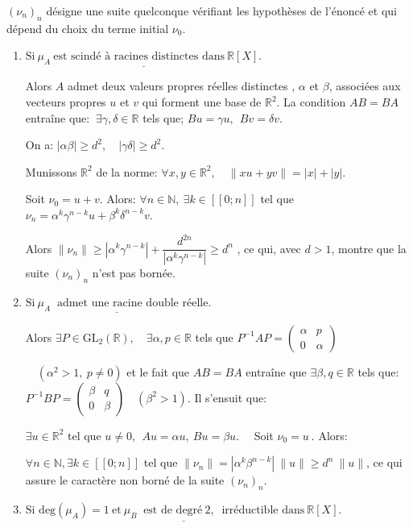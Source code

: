 $( \nu_ n) _n$ désigne une suite quelconque vérifiant les hypothèses de l'énoncé  et qui dépend du choix du terme initial $\nu_ 0.$
\begin{enumerate} 
\item $\underline{\mbox {Si}\:  \mu_A \: \mbox   {est scindé à racines distinctes dans}\: \mathbb R[X].}$

Alors $A$ admet deux valeurs propres réelles distinctes , $\alpha$ et $\beta$, associées aux vecteurs propres $u$ et $v$ qui forment une base de $\mathbb R ^2$. La condition $AB=BA$ entraîne que: $\:\exists \gamma, \delta \in \mathbb R$ tels que; $Bu =\gamma u,\:\: Bv = \delta v$. 

On a: $|\alpha \beta | \geqslant d^2, \quad |\gamma\delta |\geqslant d^2.$ 


Munissons $\mathbb R^2$ de la norme: $ \forall x,y\in \mathbb R^2,\quad \|xu+yv\| = |x| + |y|.$
  
  
  Soit $\nu_0 = u+v$. Alors: $\forall n \in \mathbb N,\:\exists k \in [\![0;n]\!]$ tel que $\nu_n = \alpha ^k \gamma^{n-k} u + \beta^{k}\delta^{n-k}v$.
  
  Alors $\|\nu_ n \|\geqslant | \alpha^k \gamma ^{n-k}|+ \dfrac {d^{2n}}{|\alpha ^k \gamma^{n-k}|}\geqslant d^{n}$ , ce qui, avec $d>1$, montre que la suite $(\nu_n)_n$ n'est pas bornée.
  \item $ \underline{ \mbox{Si} \:\mu_A \: \mbox { admet une racine double réelle}}.$
  
  Alors $\exists P\in \mbox{GL}_2 (\mathbb R), \quad \exists \alpha, p\in \mathbb R$ tels que $P^{-1}AP = \begin {pmatrix} \alpha & p\\0 &\alpha \end{pmatrix}$
  
  $\quad (\alpha^2>1, \:p\neq 0)$ et le fait que $AB=BA$ entraîne que $\exists \beta, q \in \mathbb R$ tels que: $P^{-1}BP = \begin{pmatrix} \beta & q \\0& \beta \end{pmatrix} \quad (\beta^2>1).$ 
  Il s'ensuit que: 
  
  $\exists u \in \mathbb R^2$ tel que $u\neq 0,\:\: Au =\alpha u, \:Bu = \beta u.\quad$ Soit $\nu_0 =u \:$. Alors:
  
  $\forall n \in \mathbb N, \exists k \in [\![0;n]\!]$ tel que $\|\nu_n\| = |\alpha^k \beta^{n-k}| \: \|u\| \geqslant d^{n} \:\|u\|$, ce qui assure le caractère non borné de la suite $(\nu_n)_n.$  
 \item  $\underline{\mbox{Si deg}(\mu_A) =1\:\mbox {et}\: \mu_B\:\mbox{ est de degré}\: 2,  \:\mbox{ irréductible dans}\: \mathbb R[X].}$ 
  

\end{enumerate}
